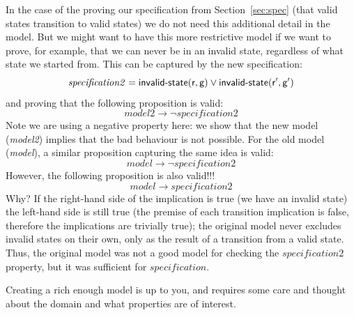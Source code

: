 In the case of the proving our specification from
Section~\ref{sec:spec} (that valid states transition to valid states)
we do not need this additional detail in the model. But we might want
to have this more restrictive model if we want to prove, for example,
that we can never be in an invalid state, regardless of what state we
started from. This can be captured by the new specification:
%
\begin{equation*}
\mathit{specification2} = \textsf{invalid-state}(\textsf{r}, \textsf{g})
\vee \textsf{invalid-state}(\textsf{r}', \textsf{g}')
\end{equation*}
%
and proving that the following proposition is valid:
$$
\mathit{model2} \rightarrow
\neg \mathit{specification2}
$$
Note we are using a negative property
here: we show that the new model (\textit{model2}) implies that the bad behaviour is not possible.
For the old model (\textit{model}), a similar proposition capturing the same idea is valid:
$$
\mathit{model} \rightarrow \neg \mathit{specification2}
$$
However, the following proposition is also valid!!!
$$
\mathit{model} \rightarrow \mathit{specification2}
$$
Why? If the right-hand side of the implication is true (we have an
invalid state) the left-hand side is still true (the premise of each
transition implication is false, therefore the implications are
trivially true); the original model never excludes invalid states on
their own, only as the result of a transition from a valid
state. Thus, the original model was not a good model for checking the
$\mathit{specification2}$ property, but it was sufficient for
$\mathit{specification}$.

Creating a rich enough model is up to you, and requires some care and
thought about the domain and what properties are of interest.

